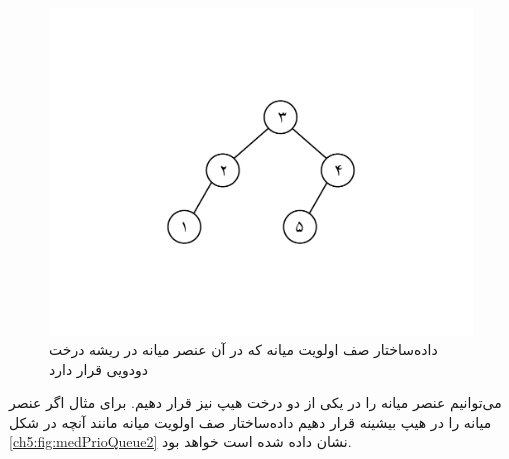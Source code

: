 \begin{figure}
\begin{center}
\includegraphics[scale=0.36]{figs/ch5/median_priority_queue_1.pdf}
\caption{داده‌ساختار صف اولویت میانه که در آن عنصر میانه در ریشه درخت دودویی قرار دارد}\label{ch5:fig:medPrioQueue1}
\end{center}
\end{figure}

می‌توانیم عنصر میانه را در یکی از دو درخت هیپ نیز قرار دهیم. برای مثال اگر عنصر میانه را در هیپ بیشینه قرار دهیم داده‌ساختار صف اولویت میانه مانند آنچه در شکل {\eqref{ch5:fig:medPrioQueue2}} نشان داده شده است خواهد بود.

